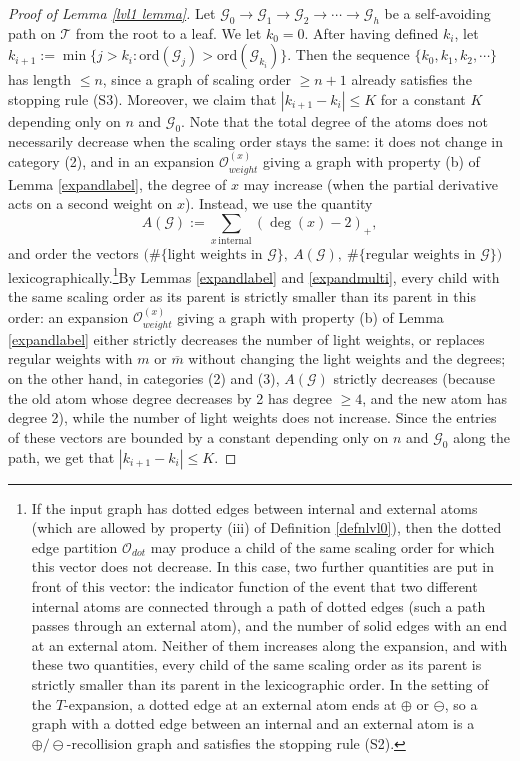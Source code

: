 \documentclass{article}
\newcommand{\1}{\mathds{1}}
\numberwithin{equation}{section}
\renewcommand{\cal}{\mathcal}
\renewcommand{\leq}{\leqslant}
\renewcommand{\geq}{\geqslant}
\renewcommand{\le}{\leq}
\renewcommand{\ge}{\geq}
\theoremstyle{plain} %
\theoremstyle{remark}
\begin{document}
\begin{proof}[Proof of Lemma \ref{lvl1 lemma}]
Let $\cal G_0 \to \cal G_1 \to \cal G_2 \to \cdots \to \cal G_h$ be a self-avoiding path on $\cal T$ from the root to a leaf. We let $k_0=0$. After having defined $k_i$, let $k_{i+1}:=\min\{j> k_i : \text{ord}(\cal G_j) > \text{ord}(\cal G_{k_i})\}$. Then the sequence $\{k_0,k_1, k_2, \cdots\}$ has length $\le n$, since a graph of scaling order $\ge n+1$ already satisfies the stopping rule (S3). Moreover, we claim that $|k_{i+1}-k_i|\le K$ for a constant $K$ depending only on $n$ and $\cal G_0$. Note that the total degree of the atoms does not necessarily decrease when the scaling order stays the same: it does not change in category (2), and in an expansion ${\cal O}_{weight}^{(x)}$ giving a graph with property (b) of Lemma \ref{expandlabel}, the degree of $x$ may increase (when the partial derivative acts on a second weight on $x$). Instead, we use the quantity
$$A(\cal G):=\sum_{x\, \text{internal}}\left(\deg(x)-2\right)_+,$$
and order the vectors $\big(\#\{\text{light weights in }\cal G\},\ A(\cal G),\ \#\{\text{regular weights in }\cal G\}\big)$ lexicographically.\footnote{If the input graph has dotted edges between internal and external atoms (which are allowed by property (iii) of Definition \ref{defnlvl0}), then the dotted edge partition $\cal O_{dot}$ may produce a child of the same scaling order for which this vector does not decrease. In this case, two further quantities are put in front of this vector: the indicator function of the event that two different internal atoms are connected through a path of dotted edges (such a path passes through an external atom), and the number of solid edges with an end at an external atom. Neither of them increases along the expansion, and with these two quantities, every child of the same scaling order as its parent is strictly smaller than its parent in the lexicographic order. In the setting of the $T$-expansion, a dotted edge at an external atom ends at $\oplus$ or $\ominus$, so a graph with a dotted edge between an internal and an external atom is a $\oplus/\ominus$-recollision graph and satisfies the stopping rule (S2).}By Lemmas \ref{expandlabel} and \ref{expandmulti}, every child with the same scaling order as its parent is strictly smaller than its parent in this order: an expansion ${\cal O}_{weight}^{(x)}$ giving a graph with property (b) of Lemma \ref{expandlabel} either strictly decreases the number of light weights, or replaces regular weights with $m$ or $\overline m$ without changing the light weights and the degrees; on the other hand, in categories (2) and (3), $A(\cal G)$ strictly decreases (because the old atom whose degree decreases by 2 has degree $\ge 4$, and the new atom has degree 2), while the number of light weights does not increase. Since the entries of these vectors are bounded by a constant depending only on $n$ and $\cal G_0$ along the path, we get that $|k_{i+1}-k_i|\le K$.

\end{proof}
\end{document}
